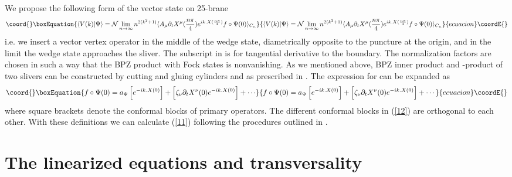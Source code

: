 \documentclass[a4paper,12pt]{article}
\begin{document}
We propose the following form of the vector state on \coordHE{}25-brane
\begin{equation}\coord{}\boxEquation{
\langle V(k)|\Psi\rangle=\mathcal{N}\lim_{n\to\infty} n^{2(k^2+1)}
\langle A_\mu\partial_t X^\mu(\frac{n\pi}{4}) e^{ik.X(\frac{n\pi}{4})}
f\circ\Psi(0)\rangle_{C_n} 
\label{11}
}{
\langle V(k)|\Psi\rangle=\mathcal{N}\lim_{n\to\infty} n^{2(k^2+1)}
\langle A_\mu\partial_t X^\mu(\frac{n\pi}{4}) e^{ik.X(\frac{n\pi}{4})}
f\circ\Psi(0)\rangle_{C_n} 
}{ecuacion}\coordE{}\end{equation}
i.e. we insert a vector vertex operator in the middle of the wedge state,
diametrically opposite to the puncture at the origin, and in the limit
\coordHE{} the wedge state approaches the sliver. The subscript in 
\coordHE{} is for tangential derivative to the boundary. 
The normalization factors are chosen in such a way that the BPZ product 
with Fock states is nonvanishing.
As we mentioned above, BPZ inner product and \myHighlight{$\star$}\coordHE{}-product of two slivers
can be constructed by cutting and gluing cylinders \coordHE{} and \coordHE{} as
prescribed in \cite{rsz3,rsz}. The expression for \coordHE{} can be
expanded as 
\begin{equation}\coord{}\boxEquation{
f\circ\Psi(0)=a_\Psi \left[ e^{-ik.X(0)}\right]+
\left[\zeta_\nu \partial_t X^\nu(0) e^{-ik.X(0)}\right] + \cdots
\label{12}
}{
f\circ\Psi(0)=a_\Psi \left[ e^{-ik.X(0)}\right]+
\left[\zeta_\nu \partial_t X^\nu(0) e^{-ik.X(0)}\right] + \cdots
}{ecuacion}\coordE{}\end{equation}
where square brackets denote the conformal blocks of primary
operators. The different conformal blocks in (\ref{12}) are orthogonal
to each other. With these definitions we can calculate
(\ref{11}) following the procedures outlined in \cite{rsz4,rv}.

\section{The linearized equations and transversality}
\end{document}
